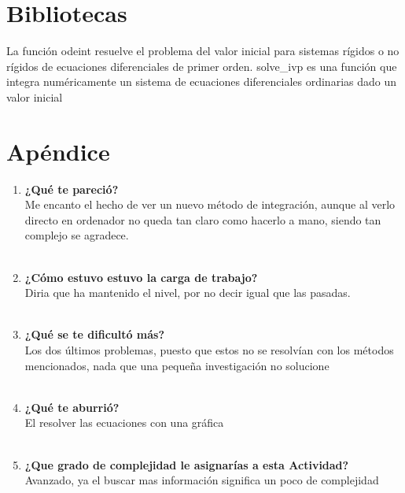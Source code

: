 \documentclass{article}
\begin{document}
 \section{\LARGE Bibliotecas}
 La función odeint resuelve el problema del valor inicial para sistemas rígidos o no rígidos de ecuaciones diferenciales de primer orden.
 solve\_ivp es una función que integra numéricamente un sistema de ecuaciones diferenciales ordinarias dado un valor inicial
  \large\textbf{}
  
 \section{\LARGE Apéndice }
 
 \begin{enumerate}
     \item\large\textbf{¿Qué te pareció?}
     \\Me encanto el hecho de ver un nuevo método de integración, aunque al verlo directo en ordenador no queda tan claro como hacerlo a mano, siendo tan complejo se agradece.
 \\
 \\
    \item\large\textbf{¿Cómo estuvo estuvo la carga de trabajo?}
    \\Diria que ha mantenido el nivel, por no decir igual que las pasadas.
 \\
 \\
    \item\large\textbf{¿Qué se te dificultó más?} 
    \\Los dos últimos problemas, puesto que estos no se resolvían con los métodos mencionados, nada que una pequeña investigación no solucione
 \\
 \\
    \item\large\textbf{¿Qué te aburrió?}
    \\El resolver las ecuaciones con una gráfica
 \\
 \\

    \item\large\textbf{¿Que grado de complejidad le asignarías a esta Actividad?}
    \\Avanzado, ya el buscar mas información significa un poco de complejidad 
 \end{enumerate}
\end{document}
